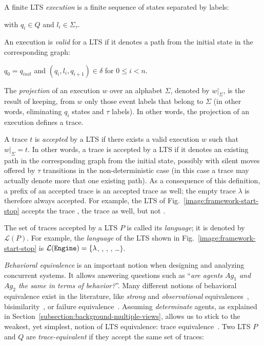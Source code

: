 A finite LTS \emph{execution} is a finite sequence of states separated by labels: 

\begin{center}
\end{center}

\noindent with $q_i \in Q$ and $l_i \in \Sigma_{\tau}$. 

An execution is \emph{valid} for a LTS if it denotes a path from the initial state in the corresponding graph:

\begin{center}
$q_0 = q_{init}$ and $(q_i,l_i,q_{i+1}) \in \delta$ for $0 \leq i < n$. 
\end{center}

The \emph{projection} of an execution $w$ over an alphabet $\Sigma$, denoted by $w|_{\Sigma}$, is the result of keeping, from $w$ only those event labels that belong to $\Sigma$ (in other words, eliminating $q_i$ states and $\tau$ labels). In other words, the projection of an execution defines a trace. 

A trace $t$ is \emph{accepted} by a LTS if there exists a valid execution $w$ such that $w|_{\Sigma} = t$. In other words, a trace is accepted by a LTS if it denotes an existing path in the corresponding graph from the initial state, possibly with silent moves offered by $\tau$ transitions in the non-deterministic case (in this case a trace may actually denote more that one existing path). As a consequence of this definition, a prefix of an accepted trace is an accepted trace as well; the empty trace $\lambda$ is therefore always accepted. For example, the LTS of Fig.~\ref{image:framework-start-stop} accepts the trace , the trace  as well, but not . 

The set of traces accepted by a LTS $P$ is called its \emph{language}; it is denoted by $\mathcal{L}(P)$. For example, the  \emph{language} of the LTS shown in Fig.~\ref{image:framework-start-stop} is $\mathcal{L}(\texttt{Engine})=\{\lambda$, , , , \ldots $\}$. 

\emph{Behavioral equivalence} is an important notion when designing and analyzing concurrent systems. It allows answering questions such as ``\emph{are agents $Ag_1$ and $Ag_2$ the same in terms of behavior?}''. Many different notions of behavioral equivalence exist in the literature, like \emph{strong} and \emph{observational}  equivalences~\cite{Milner:1989}, bisimilarity~\cite{Park:1981}, or failure equivalence~\cite{Hoare:1985}. Assuming \emph{determinate} agents, as explained in Section~\ref{subsection:background-multiple-views}, allows us to stick to the weakest, yet simplest, notion of LTS equivalence: trace equivalence~\cite{Hoare:1985, Engelfriet:1985}. Two LTS $P$ and $Q$ are \emph{trace-equivalent} if they accept the same set of traces:

